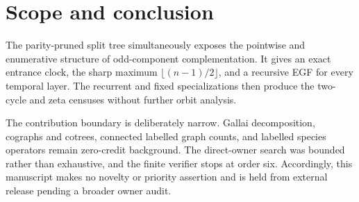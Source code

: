 \documentclass[10pt,a4paper]{amsart}
\theoremstyle{definition}
\theoremstyle{remark}
\begin{document}
\section{Scope and conclusion}

The parity-pruned split tree simultaneously exposes the pointwise and
enumerative structure of odd-component complementation. It gives an exact
entrance clock, the sharp maximum \(\lfloor(n-1)/2\rfloor\), and a recursive
EGF for every temporal layer. The recurrent and fixed specializations then
produce the two-cycle and zeta censuses without further orbit analysis.

The contribution boundary is deliberately narrow. Gallai decomposition,
cographs and cotrees, connected labelled graph counts, and labelled species
operators remain zero-credit background. The direct-owner search was
bounded rather than exhaustive, and the finite verifier stops at order six.
Accordingly, this manuscript makes no novelty or priority assertion and is
held from external release pending a broader owner audit.



\end{document}
